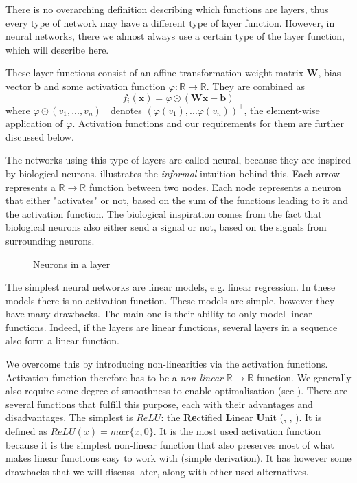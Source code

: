 There is no overarching definition describing which functions are layers, thus every type of network may have a different type of layer function. However, in neural networks, there we almost always use a certain type of the layer function, which will describe here.

These layer functions consist of an affine transformation weight matrix $\textbf{W}$, bias vector $\textbf{b}$ and some activation function $\varphi:\mathbb{R}\rightarrow\mathbb{R}$. They are combined as $$f_i(\textbf{x})=\varphi\odot(\textbf{W}\textbf{x}+\textbf{b})$$ where $\varphi\odot (v_1,...,v_n)^\top$ denotes $(\varphi(v_1),...\varphi(v_n))^\top$, the element-wise application of $\varphi$. Activation functions and our requirements for them are further discussed below. 

The networks using this type of layers are called neural, because they are inspired by biological neurons.  illustrates the \textit{informal} intuition behind this. Each arrow represents a $\mathbb{R}\rightarrow \mathbb{R}$ function between two nodes. Each node represents a neuron that either "activates" or not, based on the sum of the functions leading to it and the activation function. The biological inspiration comes from the fact that biological neurons also either send a signal or not, based on the signals from surrounding neurons.

\begin{figure}[h]
\center
\caption{Neurons in a layer}
\label{nndiagram1}
\medskip
{}
\end{figure}	

The simplest neural networks are linear models, e.g. linear regression. In these models there is no activation function. These models are simple, however they have many drawbacks. The main one is their ability to only model linear functions. Indeed, if the layers are linear functions, several layers in a sequence also form a linear function.

We overcome this by introducing non-linearities via the activation functions. Activation function therefore has to be a \textit{non-linear} $\mathbb{R}\rightarrow \mathbb{R}$ function. We generally also require some degree of smoothness to enable optimalisation (see ). There are several functions that fulfill this purpose, each with their advantages and disadvantages. The simplest is $ReLU$: the \textbf{Re}ctified \textbf{L}inear \textbf{U}nit (\cite{relu1}, \cite{relu2}, \cite{relu3}). It is defined as $ReLU(x)=max\{x,0\}$. It is the most used activation function because it is the simplest non-linear function that also preserves most of what makes linear functions easy to work with (simple derivation). It has however some drawbacks that we will discuss later, along with other used alternatives.

